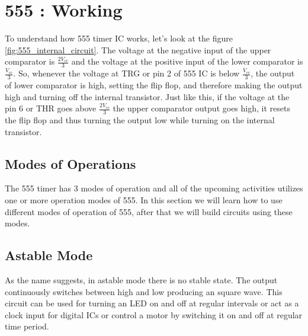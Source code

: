 \section{555 : Working}
To understand how 555 timer IC works, let's look at the figure \ref{fig:555_internal_circuit}. The voltage at the negative input of 
the upper comparator is $\frac{2V_{cc}}{3}$ and the voltage at the positive input of the lower comparator is $\frac{V_{cc}}{3}$. 
So, whenever the voltage at TRG or pin 2 of 555 IC is below $\frac{V_{cc}}{3}$, the output of lower comparator is high, setting 
the flip flop, and therefore making the output high and turning off the internal transistor. Just like this, if the voltage at 
the pin 6 or THR goes above $\frac{2V_{cc}}{3}$ the upper comparator output goes high, it resets the flip flop and thus turning 
the output low while turning on the internal transistor.

\subsection{Modes of Operations}
The 555 timer has 3 modes of operation and all of the upcoming activities utilizes one or more operation modes of 555.
In this section we will learn how to use different modes of operation of 555, after that we will build circuits using these modes.
\subsection{Astable Mode}\label{astablemode}
As the name suggests, in astable mode there is no stable state. The output continuously switches between high and low producing an
square wave. This circuit can be used for turning an LED on and off at regular intervals or act as a clock input for digital ICs
or control a motor by switching it on and off at regular time period.
